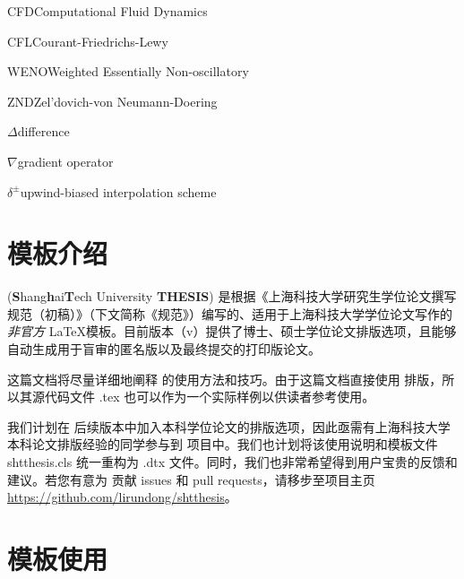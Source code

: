 \documentclass[bachelor, comfort]{shtthesis}
\begin{document}
\begin{nomenclatures}[缩写]
  \item{CFD}{Computational Fluid Dynamics}
  \item{CFL}{Courant-Friedrichs-Lewy}
  \item{WENO}{Weighted Essentially Non-oscillatory}
  \item{ZND}{Zel'dovich-von Neumann-Doering}
\end{nomenclatures}

\begin{nomenclatures}[算子 \& 说明]
  \item{$\Delta$}{difference}
  \item{$\nabla$}{gradient operator}
  \item{$\delta^{\pm}$}{upwind-biased interpolation scheme}
\end{nomenclatures}
\fi

\mainmatter
\chapter{模板介绍}
\shtthesis (\textbf{S}hang\textbf{h}ai\textbf{T}ech University \textbf{THESIS}) 是根据《上海科技大学研究生学位论文撰写规范（初稿）》（下文简称《规范》）编写的、适用于上海科技大学学位论文写作的\emph{非官方} \LaTeX 模板。目前版本（v\version）提供了博士、硕士学位论文排版选项，且能够自动生成用于盲审的匿名版以及最终提交的打印版论文。

这篇文档将尽量详细地阐释 \shtthesis 的使用方法和技巧。由于这篇文档直接使用 \shtthesis 排版，所以其源代码文件 \jobname.tex 也可以作为一个实际样例以供读者参考使用。

我们计划在 \shtthesis 后续版本中加入本科学位论文的排版选项，因此亟需有上海科技大学本科论文排版经验的同学参与到 \shtthesis 项目中。我们也计划将该使用说明和模板文件 shtthesis.cls 统一重构为 .dtx 文件。同时，我们也非常希望得到用户宝贵的反馈和建议。若您有意为 \shtthesis 贡献 issues 和 pull requests，请移步至项目主页 \url{https://github.com/lirundong/shtthesis}。

\chapter{模板使用}
\end{document}
